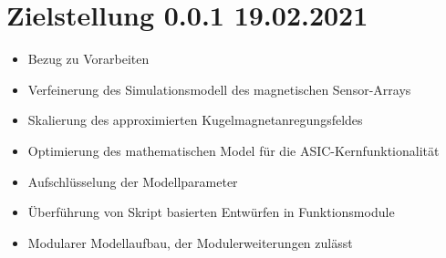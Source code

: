 %

\section{Zielstellung 0.0.1 19.02.2021}\label{sec:zielstellung}
\begin{itemize}
	\item Bezug zu Vorarbeiten
	\item Verfeinerung des Simulationsmodell des magnetischen Sensor-Arrays
	\item Skalierung des approximierten Kugelmagnetanregungsfeldes
	\item Optimierung des mathematischen Model für die ASIC-Kernfunktionalität
	\item Aufschlüsselung der Modellparameter
	\item Überführung von Skript basierten Entwürfen in Funktionsmodule
	\item Modularer Modellaufbau, der Modulerweiterungen zulässt
\end{itemize}
